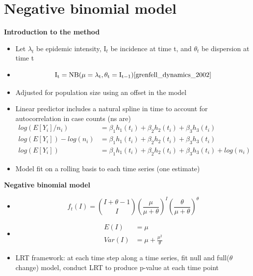 \documentclass{beamer}
\begin{document}
\section{Negative binomial model}
\begin{frame}{\textbf{Introduction to the method}}
	\begin{itemize}[<+-| alert@+>] 
		\item Let \begin{math}\lambda_t\end{math} be epidemic intensity, I\begin{math}_t\end{math} be incidence at time t, and \begin{math}\theta_t\end{math} be dispersion at time t
		\item \begin{equation}
			\mathrm{I_t = NB(\mu = \lambda_t, \theta_t = I_{t-1})} \cite{grenfell_dynamics_2002}
		\end{equation}
		\item Adjusted for population size using an offset in the model
		\item Linear predictor includes a natural spline in time to account for autocorrelation in case counts (ns are)
		\begin{align}
			log(E[Y_i]/n_i) &= \beta_1h_1(t_i) + \beta_2h_2(t_i) + \beta_3h_3(t_i) \\
			log(E[Y_i])-log(n_i) &= \beta_1h_1(t_i) + \beta_2h_2(t_i) + \beta_3h_3(t_i) \\ 
			log(E[Y_i]) &= \beta_1h_1(t_i) + \beta_2h_2(t_i) + \beta_3h_3(t_i) + log(n_i) 
		\end{align}
            \item Model fit on a rolling basis to each time series (one estimate)
	\end{itemize}
\end{frame}

\begin{frame}{\textbf{Negative binomial model}}
	\begin{itemize}[<+-| alert@+>] 
		\item 
            \begin{equation}
                f_t(I) = \binom{I + \theta - 1}{I} \left( \frac{\mu}{\mu+\theta} \right)^I \left( \frac{\theta}{\mu +\theta} \right)^\theta
            \end{equation}
		\item \begin{align}
		E(I) &= \mu\\
		Var(I) &= \mu + \frac{\mu^2}{\theta}
	\end{align}
	\item LRT framework: at each time step along a time series, fit null and full(\begin{math}\theta\end{math} change) model, conduct LRT to produce p-value at each time point
	\end{itemize}
\end{frame}
\end{document}

